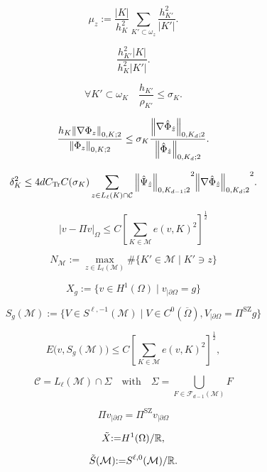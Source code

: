 \documentclass[a4paper]{article}
\begin{document}
\[
 \mu_z
 {:=}
 \frac{{\left|{K}\right|}}{h_{K}^2}
 \sum_{{K}'\subset\omega_z}
  \frac{h_{{K}'}^2}{{\left|{{K}'}\right|}}.
\]

\[
 \frac{h_{{K}'}^2{\left|{K}\right|}}{h_{K}^2{\left|{{K}'}\right|}}.
\]

\begin{equation}
\label{LocShapeReg}
 \forall {K}'\subset\omega_{K}
\quad
 \frac{h_{{K}'}}{\rho_{{K}'}}
 \leq
 \sigma_{K}.
\end{equation}

\[
 \frac{h_{K} {{\left\|{{{\nabla}{\Phi}_z}}\right\|_{{0,{K};2}}}}}
  {{{\left\|{{{\Phi}_z}}\right\|_{{0,{K};2}}}}}
 \leq
 \sigma_{K}
 \frac{{{\left\|{{{\nabla}\Hat{\Phi}_{\Hat z}}}\right\|_{{0,{{{K}_d}};2}}}}}
  {{{\left\|{{\Hat{\Phi}_{\Hat z}}}\right\|_{{0,{{{K}_d}};2}}}}}.
\]

\[
 {\delta}_{K}^2
 \leq
 4 d {{C_\text{Tr}}}
 C(\sigma_{K})
 \sum_{z\in{L_{{\ell}}}({K})\cap{\mathcal{C}}}
  {{\left\|{{\Hat{\Psi}_{\Hat z}}}\right\|_{{0,{{K}_{d-1}};2}}}}^2
  {{\left\|{{{\nabla}\Hat{\Phi}_{\Hat z}}}\right\|_{{0,{{{K}_d}};2}}}}^2.
\]

\begin{equation*}
 {\left|{v-{\Pi} v}\right|_{{\Omega}}}
 \leq
 C \left[
  \sum_{{K}\in{\mathcal{M}}} e(v,{K})^2
 \right]^{\frac12}
\end{equation*}

\[
 N_{\mathcal{M}}
 {:=}
 \max_{z\in{L_{{\ell}}}({\mathcal{M}})} \#\{{K}'\in{\mathcal{M}} \mid {K}'\ni z\}
\]

\[
 X_g {:=} \{ v \in {H^{1}}(\Omega) \mid v_{|\partial\Omega} = g \}
\]

\[
 {S}_g({\mathcal{M}})
 {:=}
 \{ V\in{S}^{{\ell},-1}({\mathcal{M}}) \mid
    V\in C^0(\overline\Omega),
    V_{|\partial\Omega} = {\Pi^{\text{SZ}}} g \}
 
 
\]

\[
  E\big( v,{S}_g({\mathcal{M}}) \big)
 \leq
 C  \left[
  \sum_{{K}\in{\mathcal{M}}} e(v,{K})^2
 \right]^{\frac12},
\]

\[
 {\mathcal{C}} = {L_{{\ell}}}({\mathcal{M}}) \cap {\Sigma}
\quad\text{with}\quad
 {\Sigma}
 =
 \bigcup_{{F}\in{\mathcal{F}_{d-1}}({\mathcal{M}})} {F}
\]

\[
 {\Pi} v_{|\partial\Omega}
  =
 {\Pi^{\text{SZ}}} v_{|\partial\Omega}
\]

\[
 \Tilde X {:=} {H^{1}}(\Omega)/{\mathbb{R}},
\]

\[
 \Tilde{S}({\mathcal{M}})
 {:=}
 {S}^{{\ell},0}({\mathcal{M}})/{\mathbb{R}}.
\]
\end{document}
